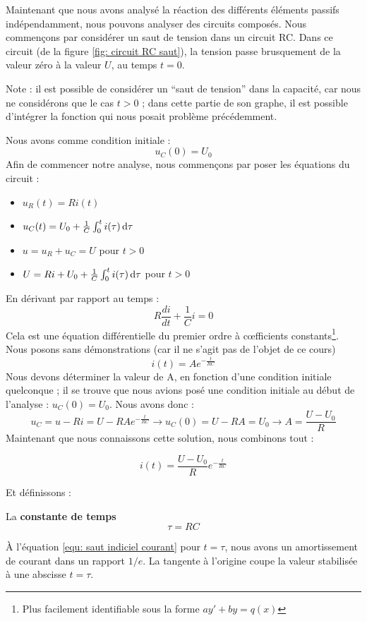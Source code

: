 \documentclass[12pt,a4paper]{article}
\begin{document}
Maintenant que nous avons analysé la réaction des différents éléments passifs indépendamment, nous pouvons analyser des circuits composés. Nous commençons par considérer un saut de tension dans un circuit RC. Dans ce circuit (de la figure \ref{fig: circuit RC saut}), la tension passe brusquement de la valeur zéro à la valeur $U$, au temps $t=0$. 
\begin{blackbox}
	Note : il est possible de considérer un ``saut de tension'' dans la capacité, car nous ne considérons que le cas $t>0$ ; dans cette partie de son graphe, il est possible d'intégrer la fonction qui nous posait problème précédemment.
\end{blackbox}
Nous avons comme condition initiale : 
\[u_C(0) = U_0\]
Afin de commencer notre analyse, nous commençons par poser les équations du circuit :
\begin{itemize}
	\item 	$u_R(t) = Ri(t)$
	\item 	$u_C(t) = U_0 + \frac{1}{C}\int_0^t i(\tau) \, \mathrm d \tau$
	\item 	$u = u_R + u_C = U$ pour $t>0$
	\item 	$U = Ri + U_0 + \frac{1}{C}\int_0^t i(\tau)\, \mathrm d \tau$ pour $t>0$
\end{itemize}
En dérivant par rapport au temps :
\[R\frac{di}{dt} + \frac{1}{C}i = 0\]
Cela est une équation différentielle du premier ordre à c\oe fficients constants\footnote{Plus facilement identifiable sous la forme $ay' + by = q(x)$}. Nous posons sans démonstrations (car il ne s'agit pas de l'objet de ce cours) 
\[i(t) = Ae^{-\frac{t}{RC}}\]
Nous devons déterminer la valeur de A, en fonction d'une condition initiale quelconque ; il se trouve que nous avions posé une condition initiale au début de l'analyse : $u_C(0) = U_0$. Nous avons donc :
\begin{equation}
	u_C = u-Ri = U-RAe^{-\frac{t}{RC}} \to u_C(0) = U-RA = U_0 \to A = \frac{U-U_0}{R}
\end{equation}
Maintenant que nous connaissons cette solution, nous combinons tout :
\begin{boite}[0.75]
	\begin{equation}
		i(t) = \frac{U-U_0}{R}e^{-\frac{t}{RC}}
		\label{equ: saut indiciel courant}
	\end{equation}
\end{boite}
Et définissons :
\begin{boite}
	La \textbf{constante de temps}
	\[\tau = RC\]
\end{boite}
À l'équation  \ref{equ: saut indiciel courant} pour $t=\tau$, nous avons un amortissement de courant dans un rapport $1/e$. La tangente à l'origine coupe la valeur stabilisée à une abscisse $t=\tau$.
\end{document}
